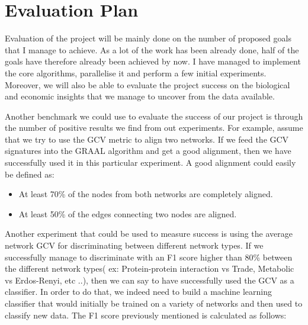 \chapter{Evaluation Plan}

Evaluation of the project will be mainly done on the number of proposed goals
that I manage to achieve. As a lot of the work has been already done, half of
the goals have therefore already been achieved by now. I have managed to
implement the core algorithms, parallelise it and perform a few initial
experiments. Moreover, we will also be able to evaluate the project success on
the biological and economic insights that we manage to uncover from the data
available.

Another benchmark we could use to evaluate the success of our project is
through the number of positive results we find from out experiments. For
example, assume that we try to use the GCV metric to align two networks. If we
feed the GCV signatures into the GRAAL algorithm and get a good alignment, then
we have successfully used it in this particular experiment. A good alignment
could easily be defined as:
\begin{itemize}
 \item At least 70\% of the nodes from both networks are completely aligned. 
 \item At least 50\% of the edges connecting two nodes are aligned.
\end{itemize}

Another experiment that could be used to measure success is using
the average network GCV for discriminating between different network types. If
we successfully manage to discriminate with an F1 score higher than 80\%
between the different network types( ex: Protein-protein interaction vs Trade,
Metabolic vs Erdos-Renyi, etc ..), then we can say to have successfully used
the GCV as a classifier. In order to do that, we indeed need to build a machine
learning classifier that would initially be trained on a variety of networks
and then used to classify new data. The F1 score previously mentioned is
calculated as follows:

